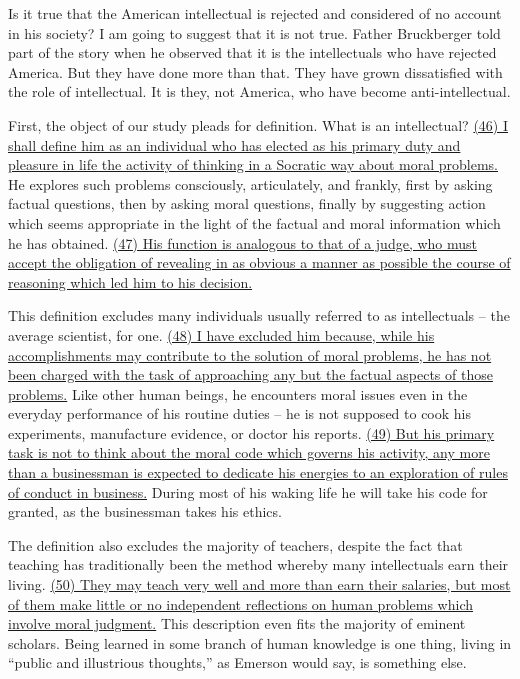 
\qquad Is it true that the American intellectual is rejected and considered of no account in his society? I am going to suggest that it is not true. Father Bruckberger told part of the story when he observed that it is the intellectuals who have rejected America. But they have done more than that. They have grown dissatisfied with the role of intellectual. It is they, not America, who have become anti-intellectual.

\qquad First, the object of our study pleads for definition. What is an intellectual? \ul{(46) I shall define him as an individual who has elected as his primary duty and pleasure in life the activity of thinking in a Socratic way about moral problems.} He explores such problems consciously, articulately, and frankly, first by asking factual questions, then by asking moral questions, finally by suggesting action which seems appropriate in the light of the factual and moral information which he has obtained. \ul{(47) His function is analogous to that of a judge, who must accept the obligation of revealing in as obvious a manner as possible the course of reasoning which led him to his decision.}

\qquad This definition excludes many individuals usually referred to as intellectuals -- the average scientist, for one. \ul{(48) I have excluded him because, while his accomplishments may contribute to the solution of moral problems, he has not been charged with the task of approaching any but the factual aspects of those problems.} Like other human beings, he encounters moral issues even in the everyday performance of his routine duties -- he is not supposed to cook his experiments, manufacture evidence, or doctor his reports. \ul{(49) But his primary task is not to think about the moral code which governs his activity, any more than a businessman is expected to dedicate his energies to an exploration of rules of conduct in business.} During most of his waking life he will take his code for granted, as the businessman takes his ethics.

\qquad The definition also excludes the majority of teachers, despite the fact that teaching has traditionally been the method whereby many intellectuals earn their living. \ul{(50) They may teach very well and more than earn their salaries, but most of them make little or no independent reflections on human problems which involve moral judgment.} This description even fits the majority of eminent scholars. Being learned in some branch of human knowledge is one thing, living in ``public and illustrious thoughts,'' as Emerson would say, is something else.